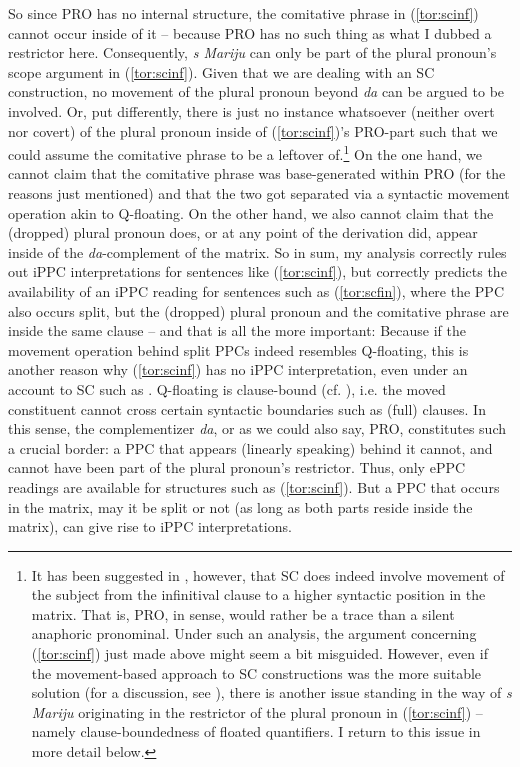\documentclass[output=paper,colorlinks,citecolor=brown]{langscibook}
\begin{document}
So since PRO has no internal structure, the comitative phrase in (\ref{tor:scinf}) cannot occur inside of it -- because PRO has no such thing as what I dubbed a restrictor here. Consequently, \textit{s Mariju} can only be part of the plural pronoun's scope argument in (\ref{tor:scinf}). Given that we are dealing with an SC construction, no movement of the plural pronoun beyond \textit{da} can be argued to be involved. Or, put differently, there is just no instance whatsoever (neither overt nor covert) of the plural pronoun inside of (\ref{tor:scinf})'s PRO-part such that we could assume the comitative phrase to be a leftover of.\footnote{It has been suggested in \citet{Hornstein1999}, however, that SC does indeed involve movement of the subject from the infinitival clause to a higher syntactic position in the matrix. That is, PRO, in  sense, would rather be a trace than a silent anaphoric pronominal. Under such an analysis, the argument concerning (\ref{tor:scinf}) just made above might seem a bit misguided. However, even if the movement-based approach to SC constructions was the more suitable solution (for a discussion, see \cite{Landau2003}), there is another issue standing in the way of \textit{s Mariju} originating in the restrictor of the plural pronoun in (\ref{tor:scinf}) -- namely clause-boundedness of floated quantifiers. I return to this issue in more detail below.} On the one hand, we cannot claim that the comitative phrase was base-generated within PRO (for the reasons just mentioned) and that the two got separated via a syntactic movement operation akin to Q-floating. On the other hand, we also cannot claim that the (dropped) plural pronoun does, or at any point of the derivation did, appear inside of the \textit{da}-complement of the matrix. So in sum, my analysis correctly rules out iPPC interpretations for sentences like (\ref{tor:scinf}), but correctly predicts the availability of an iPPC reading for sentences such as (\ref{tor:scfin}), where the PPC also occurs split, but the (dropped) plural pronoun and the comitative phrase are inside the same clause -- and that is all the more important: Because if the movement operation behind split PPCs indeed resembles Q-floating, this is another reason why (\ref{tor:scinf}) has no iPPC interpretation, even under an account to SC such as . Q-floating is clause-bound (cf. \cite{Kayne1981}), i.e. the moved constituent cannot cross certain syntactic boundaries such as (full) clauses. In this sense, the complementizer \textit{da}, or as we could also say, PRO, constitutes such a crucial border: a PPC that appears (linearly speaking) behind it cannot, and cannot have been part of the plural pronoun's restrictor. Thus, only ePPC readings are available for structures such as (\ref{tor:scinf}). But a PPC that occurs in the matrix, may it be split or not (as long as both parts reside inside the matrix), can give rise to iPPC interpretations. 
\end{document}
